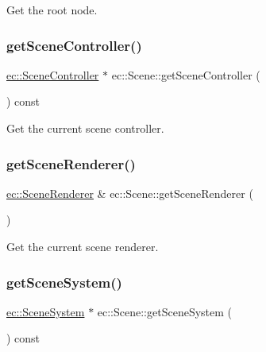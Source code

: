 Get the root node. 

\mbox{\label{classec_1_1_scene_ad562a16db4552e529af7284de0b79304}} 
\subsubsection{\texorpdfstring{get\+Scene\+Controller()}{getSceneController()}}
{\footnotesize\ttfamily \mbox{\hyperlink{classec_1_1_scene_controller}{ec\+::\+Scene\+Controller}} $\ast$ ec\+::\+Scene\+::get\+Scene\+Controller (\begin{DoxyParamCaption}{ }\end{DoxyParamCaption}) const}



Get the current scene controller. 

\mbox{\label{classec_1_1_scene_a73f48395e9442f3e6647dd9503050b91}} 
\subsubsection{\texorpdfstring{get\+Scene\+Renderer()}{getSceneRenderer()}}
{\footnotesize\ttfamily \mbox{\hyperlink{classec_1_1_scene_renderer}{ec\+::\+Scene\+Renderer}} \& ec\+::\+Scene\+::get\+Scene\+Renderer (\begin{DoxyParamCaption}{ }\end{DoxyParamCaption})}



Get the current scene renderer. 

\mbox{\label{classec_1_1_scene_a95b79ca1dc856cb50262ab4b9e72465f}} 
\subsubsection{\texorpdfstring{get\+Scene\+System()}{getSceneSystem()}}
{\footnotesize\ttfamily \mbox{\hyperlink{classec_1_1_scene_system}{ec\+::\+Scene\+System}} $\ast$ ec\+::\+Scene\+::get\+Scene\+System (\begin{DoxyParamCaption}{ }\end{DoxyParamCaption}) const}



